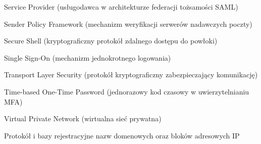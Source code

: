 \begin{abbreviations}
    \item[SP]    Service Provider (usługodawca w architekturze federacji tożsamości SAML)
    \item[SPF]   Sender Policy Framework (mechanizm weryfikacji serwerów nadawczych poczty)
    \item[SSH]   Secure Shell (kryptograficzny protokół zdalnego dostępu do powłoki)
    \item[SSO]   Single Sign-On (mechanizm jednokrotnego logowania)
    \item[TLS]   Transport Layer Security (protokół kryptograficzny zabezpieczający komunikację)
    \item[TOTP]  Time-based One-Time Password (jednorazowy kod czasowy w uwierzytelnianiu MFA)
    \item[VPN]   Virtual Private Network (wirtualna sieć prywatna)
    \item[WHOIS] Protokół i bazy rejestracyjne nazw domenowych oraz bloków adresowych IP
\end{abbreviations}
